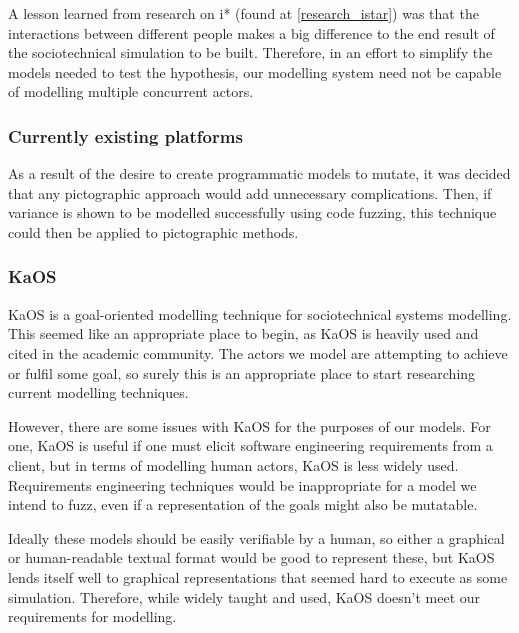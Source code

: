 \documentclass[11pt, twocolumn]{article}
\begin{document}
A lesson learned from research on i* (found at \cref{research_istar}) was that the interactions between different people makes a big difference to the end result of the sociotechnical simulation to be built. Therefore, in an effort to simplify the models needed to test the hypothesis, our modelling system need not be capable of modelling multiple concurrent actors. 

\subsubsection{Currently existing platforms}
As a result of the desire to create programmatic models to mutate, it was decided that any pictographic approach would add unnecessary complications. Then, if variance is shown to be modelled successfully using code fuzzing, this technique could then be applied to pictographic methods. \par

\subsubsection{KaOS} 
KaOS is a goal-oriented modelling technique for sociotechnical systems modelling\cite{Werneck2009}. This seemed like an appropriate place to begin, as KaOS is heavily used and cited in the academic community. The actors we model are attempting to achieve or fulfil some goal, so surely this is an appropriate place to start researching current modelling techniques.\par%
However, there are some issues with KaOS for the purposes of our models. For one, KaOS is useful if one must elicit software engineering requirements from a client, but in terms of modelling human actors, KaOS is less widely used. Requirements engineering techniques would be inappropriate for a model we intend to fuzz, even if a representation of the goals might also be mutatable. \par 
Ideally these models should be easily verifiable by a human, so either a graphical or human-readable textual format would be good to represent these, but KaOS lends itself well to graphical representations that seemed hard to execute as some simulation. Therefore, while widely taught and used, KaOS doesn't meet our requirements for modelling. \par
\end{document}
